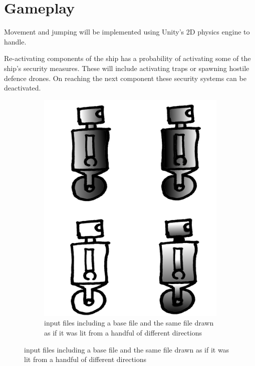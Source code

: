\section{Gameplay}




Movement and jumping will be implemented using Unity's 2D physics engine to handle.

Re-activating components of the ship has a probability of activating some of the ship's security measures. These will include activating traps or spawning hostile defence drones. On reaching the next component these security systems can be deactivated.

\begin{figure}[ht]
\centering
\begin{subfigure}{.5\textwidth}
  \centering
  \includegraphics[scale=0.2, trim = 0cm 0cm 0cm 2cm]{images/in}
  \caption{input files including a base file and the same file drawn as if it was lit from a handful of different directions}
  \label{fig:sub1:pl}
\end{subfigure}%

\end{figure}
